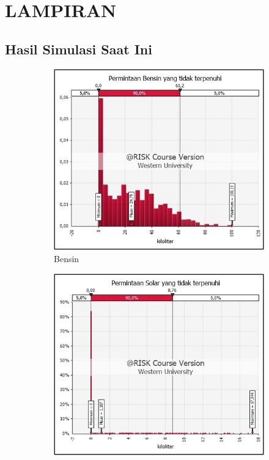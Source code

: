 \chapter{LAMPIRAN}
\label{chap:lampiran}

\section*{Hasil Simulasi Saat Ini}
\label{sec:hasil-simul-existing}

\begin{figure}[!ht]
    \centering
    \begin{subfigure}{0.48\textwidth}
        \centering
        \includegraphics[width=\textwidth]{grafik/minus-bensin-saat-ini.jpg}
        \caption{Bensin}
        \label{fig:minus-bensin-saat-ini}
    \end{subfigure}
    \hfill
    \begin{subfigure}{0.48\textwidth}
        \centering
        \includegraphics[width=\textwidth]{grafik/minus-solar-saat-ini.jpg}

\end{subfigure}
\end{figure}
